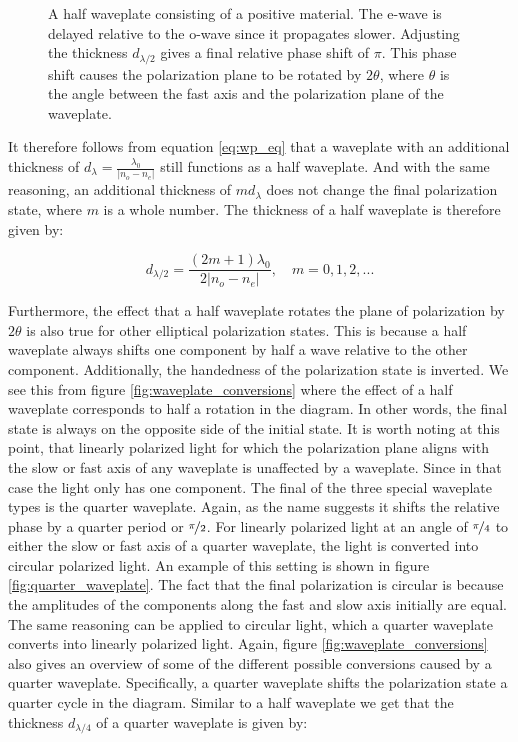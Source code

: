 \begin{figure}[h]
    \centering
    
    \caption{A half waveplate consisting of a positive material. The e-wave is delayed relative to the o-wave since it propagates slower. Adjusting the thickness $d_{\lambda/2}$ gives a final relative phase shift of $\pi$. This phase shift causes the polarization plane to be rotated by $2\theta$, where $\theta$ is the angle between the fast axis and the polarization plane of the waveplate.}
    \label{fig:half_waveplate}
\end{figure}

\newpage

It therefore follows from equation \ref{eq:wp_eq} that a waveplate with an additional thickness of $d_{\lambda}=\frac{\lambda_0}{|n_o - n_e|}$ still functions as a half waveplate. And with the same reasoning, an additional thickness of $md_{\lambda}$ does not change the final polarization state, where $m$ is a whole number. The thickness of a half waveplate is therefore given by:

\begin{equation}
    \label{eq:thickness_half_waveplate}
    d_{\lambda/2} = \frac{(2m+1)\lambda_0}{2|n_o - n_e|}, \quad m=0,1,2,... 
\end{equation}

Furthermore, the effect that a half waveplate rotates the plane of polarization by $2\theta$ is also true for other elliptical polarization states. This is because a half waveplate always shifts one component by half a wave relative to the other component. Additionally, the handedness of the polarization state is inverted. We see this from figure \ref{fig:waveplate_conversions} where the effect of a half waveplate corresponds to half a rotation in the diagram. In other words, the final state is always on the opposite side of the initial state. It is worth noting at this point, that linearly polarized light for which the polarization plane aligns with the slow or fast axis of any waveplate is unaffected by a waveplate. Since in that case the light only has one component. The final of the three special waveplate types is the quarter waveplate. Again, as the name suggests it shifts the relative phase by a quarter period or $\nicefrac{\pi}{2}$. For linearly polarized light at an angle of $\nicefrac{\pi}{4}$ to either the slow or fast axis of a quarter waveplate, the light is converted into circular polarized light. An example of this setting is shown in figure \ref{fig:quarter_waveplate}. The fact that the final polarization is circular is because the amplitudes of the components along the fast and slow axis initially are equal. The same reasoning can be applied to circular light, which a quarter waveplate converts into linearly polarized light. Again, figure \ref{fig:waveplate_conversions} also gives an overview of some of the different possible conversions caused by a quarter waveplate. Specifically, a quarter waveplate shifts the polarization state a quarter cycle in the diagram. Similar to a half waveplate we get that the thickness $d_{\lambda/4}$ of a quarter waveplate is given by:

